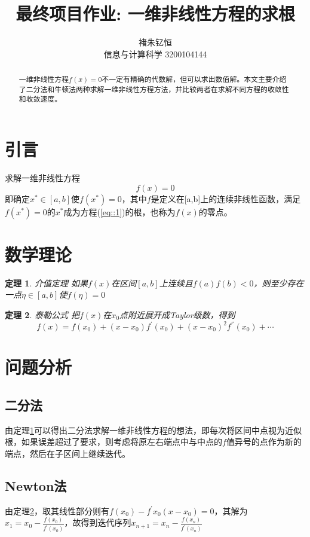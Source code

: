 \documentclass{article}
\title{最终项目作业: 一维非线性方程的求根}
\author{褚朱钇恒 \\ 信息与计算科学 3200104144}
\newtheorem{theorem}{定理}
\begin{document}
\maketitle
\begin{abstract}
     一维非线性方程$f(x)=0$不一定有精确的代数解，但可以求出数值解。本文主要介绍了二分法和牛顿法两种求解一维非线性方程方法，并比较两者在求解不同方程的收敛性和收敛速度。
     
\end{abstract}
\section{引言}
     求解一维非线性方程
     \begin{equation}
          f(x)=0
          \label{eq::1}
     \end{equation}
     即确定$x^*\in[a,b]$使$f(x^*)=0$，其中$f$是定义在[a,b]上的连续非线性函数，满足$f(x^*)=0$的$x^*$成为方程(\ref{eq::1})的根，也称为$f(x)$的零点。
\section{数学理论\cite{mathematical_analysis}}
     \begin{theorem}{介值定理}
          \label{the::intermediate}
          如果$f(x)$在区间$[a,b]$上连续且$f(a)f(b)<0$，则至少存在一点$\eta\in[a,b]$使$f(\eta)=0$

     \end{theorem}
     \begin{theorem}{泰勒公式}
          \label{the::taylor}
          把$f(x)$在$x_0$点附近展开成Taylor级数，得到
          $$f(x)=f(x_0)+(x-x_0)f^{'}(x_0)+(x-x_0)^2f^{''}(x_0)+\cdots$$
     \end{theorem}
     
\section{问题分析}
     \subsection{二分法}
     由定理\ref{the::intermediate}可以得出二分法求解一维非线性方程的想法，即每次将区间中点视为近似根，如果误差超过了要求，则考虑将原左右端点中与中点的$f$值异号的点作为新的端点，然后在子区间上继续迭代。

     \subsection{Newton法}
     由定理\ref{the::taylor}，取其线性部分则有$f(x_0)-f^{'}{x_0}(x-x_0)=0$，其解为$x_1=x_0-\frac{f(x_0)}{f^{'}(x_0)}$，故得到迭代序列$x_{n+1}=x_n-\frac{f(x_n)}{f^{'}(x_n)}$
     
\end{document}
